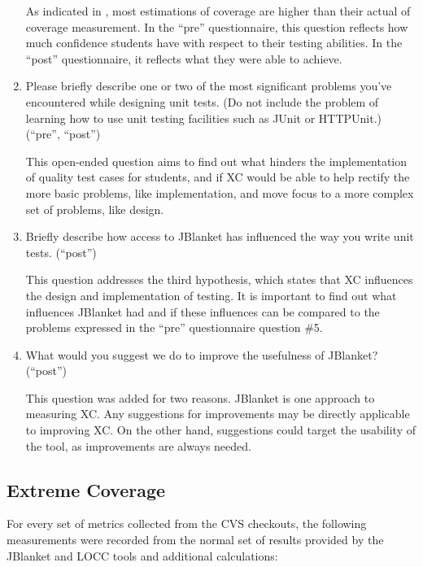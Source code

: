 \begin{enumerate}
As indicated in \cite{Piwowarski:1993}, most estimations of coverage are
higher than their actual of coverage measurement.  In the ``pre''
questionnaire, this question reflects how much confidence students have
with respect to their testing abilities.  In the ``post'' questionnaire, it
reflects what they were able to achieve.

\item Please briefly describe one or two of the most significant problems
you've encountered while designing unit tests.  (Do not include the problem
of learning how to use unit testing facilities such as JUnit or HTTPUnit.)
(``pre'', ``post'')

This open-ended question aims to find out what hinders the implementation
of quality test cases for students, and if XC would be able to help rectify
the more basic problems, like implementation, and move focus to a more
complex set of problems, like design.

\item Briefly describe how access to JBlanket has influenced the way you
write unit tests. (``post'')

This question addresses the third hypothesis, which states that XC
influences the design and implementation of testing.  It is important to
find out what influences JBlanket had and if these influences can be
compared to the problems expressed in the ``pre'' questionnaire question
\#5.

\item What would you suggest we do to improve the usefulness of JBlanket?
(``post'')

This question was added for two reasons.  JBlanket is one approach to
measuring XC.  Any suggestions for improvements may be directly applicable
to improving XC.  On the other hand, suggestions could target the usability
of the tool, as improvements are always needed.
\end{enumerate}

\subsection{Extreme Coverage}
For every set of metrics collected from the CVS checkouts, the following
measurements were recorded from the normal set of results provided by the
JBlanket and LOCC tools and additional calculations:

